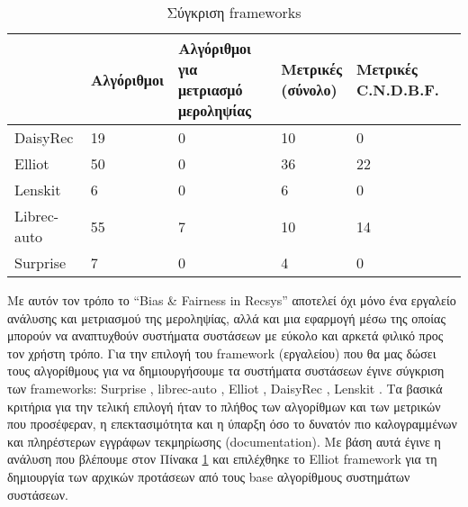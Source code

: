 \begin{table}[H]
	\centering	
	\caption {Σύγκριση frameworks} \label{tab:framework}
	\begin{tabular}{|l|l|l|l|ll|}
		\hline
		& Αλγόριθμοι & \shortstack{Αλγόριθμοι για \\ μετριασμό μεροληψίας} \rule{0mm}{9mm} & \shortstack{Μετρικές \\ (σύνολο)} & \shortstack{Μετρικές \\ C.N.D.B.F. \footnotemark{} } &  \\ \hline
		DaisyRec    & 19         &       0     & 10       & 0        &  \\ \hline
		Elliot     & 50         &        0    &       36   &      22    &  \\ \hline
		Lenskit            &       6     &      0     &       6     &      0    &  \\ \hline
		Librec-auto &   55         &       7      &     10     &   14       &  \\ \hline
		Surprise   &       7     & 0          &      4    & 0        & \\ \hline
	\end{tabular}
\end{table}
Με αυτόν τον τρόπο το “Bias \& Fairness in Recsys” αποτελεί όχι μόνο ένα εργαλείο ανάλυσης και μετριασμού της μεροληψίας, αλλά και μια εφαρμογή μέσω της οποίας μπορούν να αναπτυχθούν συστήματα συστάσεων με εύκολο και αρκετά φιλικό προς τον χρήστη τρόπο.
Για την επιλογή του framework (εργαλείου)  που θα μας δώσει τους αλγορίθμους για να δημιουργήσουμε τα συστήματα συστάσεων έγινε σύγκριση των frameworks:  Surprise \cite{hugSurprisePythonLibrary2020}, librec-auto \cite{mansouryAutomatingRecommenderSystems2018}, Elliot \cite{anelliElliotComprehensiveRigorous2021}, DaisyRec \cite{sunAreWeEvaluating2020}, Lenskit \cite{ekstrandLensKitPythonNextGeneration2020}. Τα βασικά κριτήρια για την τελική επιλογή ήταν το πλήθος των αλγορίθμων και των μετρικών που προσέφεραν, η επεκτασιμότητα και η ύπαρξη όσο το δυνατόν πιο καλογραμμένων και πληρέστερων εγγράφων τεκμηρίωσης (documentation). Με βάση αυτά έγινε η ανάλυση που βλέπουμε στον Πίνακα \ref{tab:framework} και επιλέχθηκε το Elliot framework για τη δημιουργία των αρχικών προτάσεων από τους base αλγορίθμους συστημάτων συστάσεων.

